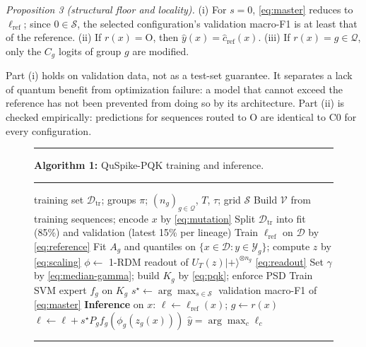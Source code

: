 \documentclass[conference]{IEEEtran}
\begin{document}
\textit{Proposition 3 (structural floor and locality).} (i) For $s=0$, \eqref{eq:master} reduces to $\ell_{\mathrm{ref}}$; since $0\in\mathcal{S}$, the selected configuration's validation macro-F1 is at least that of the reference. (ii) If $r(x)=\mathrm{O}$, then $\hat{y}(x)=\hat{c}_{\mathrm{ref}}(x)$. (iii) If $r(x)=g\in\mathcal{Q}$, only the $C_g$ logits of group $g$ are modified.

Part (i) holds on validation data, not as a test-set guarantee. It separates a lack of quantum benefit from optimization failure: a model that cannot exceed the reference has not been prevented from doing so by its architecture. Part (ii) is checked empirically: predictions for sequences routed to O are identical to C0 for every configuration.

\begin{figure}[!t]
    \hrule\smallskip
    \noindent\textbf{Algorithm 1:} QuSpike-PQK training and inference.
    \smallskip\hrule\smallskip
    \footnotesize
    \begin{algorithmic}[1]
        \REQUIRE training set $\mathcal{D}_{\mathrm{tr}}$; groups $\pi$; $(n_g)_{g\in\mathcal{Q}}$, $T$, $\tau$; grid $\mathcal{S}$
        \STATE Build $\mathcal{V}$ from training sequences; encode $x$ by \eqref{eq:mutation}
        \STATE Split $\mathcal{D}_{\mathrm{tr}}$ into fit (85\%) and validation (latest 15\% per lineage)
            \STATE Train $\ell_{\mathrm{ref}}$ on $\mathcal{D}$ by \eqref{eq:reference}
                \STATE Fit $A_g$ and quantiles on $\{x\in\mathcal{D}:y\in\mathcal{Y}_g\}$; compute $z$ by \eqref{eq:scaling}
                \STATE $\phi\leftarrow$ 1-RDM readout of $U_T(z)|{+}\rangle^{\otimes n_g}$ \eqref{eq:readout} 
                \STATE Set $\gamma$ by \eqref{eq:median-gamma}; build $K_g$ by \eqref{eq:pqk}; enforce PSD
                \STATE Train SVM expert $f_g$ on $K_g$
            \ENDFOR
                \STATE $s^{\star}\leftarrow\arg\max_{s\in\mathcal{S}}$ validation macro-F1 of \eqref{eq:master}
            \ENDIF
        \ENDFOR
        \STATE \textbf{Inference} on $x$: $\ell\leftarrow\ell_{\mathrm{ref}}(x)$; $g\leftarrow r(x)$
            \STATE $\ell\leftarrow\ell+s^{\star}P_g f_g(\phi_g(z_g(x)))$
        \ENDIF
        \RETURN $\hat{y}=\arg\max_c\ell_c$
    \end{algorithmic}
    \smallskip\hrule
\end{figure}
\end{document}
